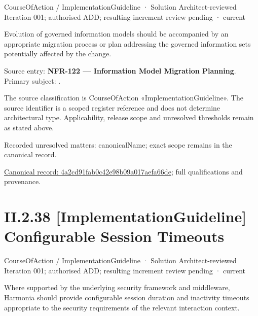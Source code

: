 \label{element:4a2cd91fab0c42e98b09a017aefa66de}
{\small CourseOfAction / ImplementationGuideline · Solution Architect-reviewed Iteration 001; authorised ADD; resulting increment review pending · current}\par

Evolution of governed information models should be accompanied by an appropriate migration process or plan addressing the governed information sets potentially affected by the change.



Source entry: \textbf{NFR-122 — Information Model Migration Planning}. Primary subject: \texttt{}.



The source classification is CourseOfAction «ImplementationGuideline». The source identifier is a scoped register reference and does not determine architectural type. Applicability, release scope and unresolved thresholds remain as stated above.


{\small Recorded unresolved matters: canonicalName; exact scope remains in the canonical record.}\par
{\footnotesize \href{../../../../continuum/strategy/course-of-action/implementation-guideline/4a2cd91fab0c42e98b09a017aefa66de.md}{Canonical record: 4a2cd91fab0c42e98b09a017aefa66de}; full qualifications and provenance.}\par
\section*{II.2.38 [ImplementationGuideline] Configurable Session Timeouts}
\label{navigation:II.2.38}

\label{element:886896239b2e40b0b3bda53e922a2ab6}
{\small CourseOfAction / ImplementationGuideline · Solution Architect-reviewed Iteration 001; authorised ADD; resulting increment review pending · current}\par

Where supported by the underlying security framework and middleware, Harmonia should provide configurable session duration and inactivity timeouts appropriate to the security requirements of the relevant interaction context.



